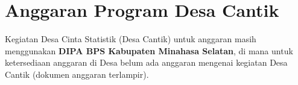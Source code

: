\section{Anggaran Program Desa Cantik}

Kegiatan Desa Cinta Statistik (Desa Cantik) untuk anggaran masih menggunakan \textbf{\textcolor{bpsnavy}{DIPA BPS Kabupaten Minahasa Selatan}}, di mana untuk ketersediaan anggaran di Desa belum ada anggaran mengenai kegiatan Desa Cantik (dokumen anggaran terlampir).
